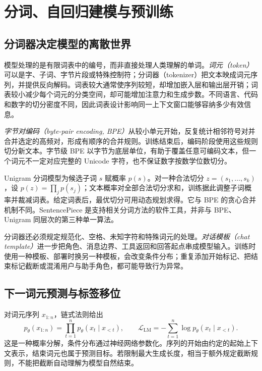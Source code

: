 \setcounter{chapter}{3} %
\chapter{分词、自回归建模与预训练}
\label{ch:pretraining}

\section{分词器决定模型的离散世界}

模型处理的是有限词表中的编号，而非直接处理人类理解的单词。\emph{词元（token）}可以是字、子词、字节片段或特殊控制符；分词器（tokenizer）把文本映成词元序列，并提供反向解码。词表较大通常使序列较短，却增加嵌入层和输出层开销；词表较小减少每个词元的分类空间，却可能增加注意力和生成步数。不同语言、代码和数字的切分密度不同，因此词表设计影响同一上下文窗口能够容纳多少有效信息。

\emph{字节对编码（byte-pair encoding, BPE）}从较小单元开始，反复统计相邻符号对并合并选定的高频对，形成有顺序的合并规则。训练结束后，编码阶段使用这些规则切分新文本。字节级 BPE 以字节为底层单位，有助于覆盖任意可编码文本，但一个词元不一定对应完整的 Unicode 字符，也不保证数字按数学位数切分。

Unigram 分词模型为候选子词 $s$ 赋概率 $p(s)$。对一种合法切分 $z=(s_1,\ldots,s_k)$，设 $p(z)=\prod_jp(s_j)$；文本概率对全部合法切分求和，训练据此调整子词概率并裁减词表。给定词表后，最优切分可用动态规划求得。它与 BPE 的贪心合并机制不同。SentencePiece 是支持相关分词方法的软件工具，并非与 BPE、Unigram 同层次的第三种单一算法\cite{sentencepiece}。

分词器还必须规定规范化、空格、未知字符和特殊词元的处理。\emph{对话模板（chat template）}进一步把角色、消息边界、工具返回和回答起点串成模型输入。训练时使用一种模板、部署时换另一种模板，会改变条件分布；重复添加开始标记、把结束标记截断或混淆用户与助手角色，都可能导致行为异常。

\section{下一词元预测与标签移位}

对词元序列 $x_{1:n}$，链式法则给出
\begin{equation}
p_\theta(x_{1:n})=\prod_{t=1}^np_\theta(x_t\mid x_{<t}),\qquad
\mathcal L_{\mathrm{LM}}=-\sum_{t=1}^n\log p_\theta(x_t\mid x_{<t}).
\label{eq:autoregressive}
\end{equation}
这是一种概率分解，条件分布通过神经网络参数化。序列的开始由约定的起始上下文表示，结束词元也属于预测目标。若限制最大生成长度，相当于额外规定截断规则，不能把截断自动理解为模型自然结束。

